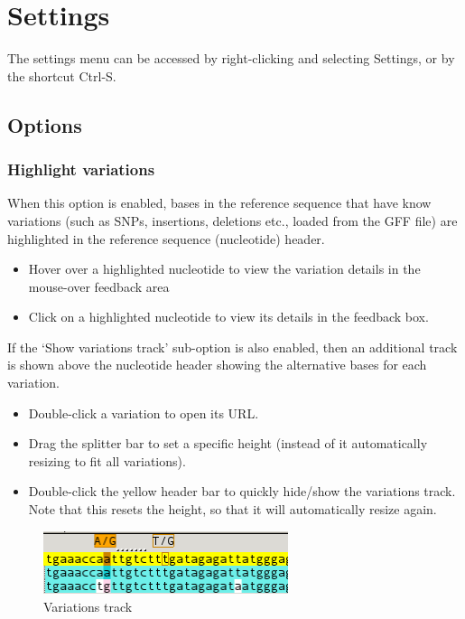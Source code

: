 \documentclass[letterpaper]{article}
\begin{document}
\bigskip

{\color[rgb]{0.0,0.27058825,0.5254902}\section[Settings]{Settings}}
\hypertarget{RefHeading2221056909880}{}
The settings menu can be accessed by right-clicking and selecting Settings, or by the shortcut Ctrl-S.

{\color[rgb]{0.30980393,0.5058824,0.7411765}\subsection[Features]{Options}}
\hypertarget{RefHeading2241056909880}{}
{\color[rgb]{0.30980393,0.5058824,0.7411765}\subsubsection[Highlight variations]{Highlight variations}}
\hypertarget{RefHeading2261056909880}{}
When this option is enabled, bases in the reference sequence that have know variations (such as SNPs, insertions, deletions etc., loaded from the GFF file) are highlighted in the reference sequence (nucleotide) header.

\begin{itemize}
\item Hover over a highlighted nucleotide to view the variation details in the mouse-over feedback area
\item Click on a highlighted nucleotide to view its details in the feedback box.
\end{itemize}

\bigskip

If the {\textquoteleft}Show variations track{\textquoteright} sub-option is also enabled, then an additional track is shown above the nucleotide header showing the alternative bases for each variation.
\begin{itemize}
\item Double-click a variation to open its URL. 
\item Drag the splitter bar to set a specific height (instead of it automatically resizing to fit all variations).
\item Double-click the yellow header bar to quickly hide/show the variations track. Note that this resets the height, so that it will automatically resize again.
\end{itemize}

\begin{figure}
\centering
\color[rgb]{0.30980393,0.5058824,0.7411765}
\includegraphics[width=7.181cm,height=1.852cm]{img_view_variations.png}
\caption{Variations track}
\end{figure}
\end{document}
